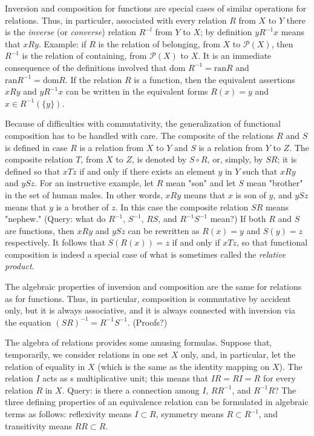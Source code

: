 Inversion and composition for functions are special cases of similar operations for relations. Thus, in particuler, associated with every relation $R$ from $X$ to $Y$ there is the \textit{inverse} (or \textit{converse}) relation $R^{-l}$ from $Y$ to $X$; by definition $y R^{-1} x$ means that $xRy$. Example: if $R$ is the relation of belonging, from $X$ to $\mathcal{P}(X)$, then $R^{-1}$ is the relation of containing, from $\mathcal{P}(X)$ to $X$. It is an immediate consequence of the definitions involved that $\text{dom }R^{-1} = \text{ran} R$ and $\text{ran}R^{-1} = \text{dom} R$. If the relation $R$ is a function, then the equivalent assertions $xRy$ and $yR^{-1}x$ can be written in the equivalent forms $R(x) = y$ and $x \in R^{-1}( \{ y \} )$. 

Because of difficulties with commutativity, the generalization of functional composition has to be handled with care. The composite of the relations $R$ and $S$ is defined in case $R$ is a relation from $X$ to $Y$ and $S$ is a relation from $Y$ to $Z$. The composite relation $T$, from $X$ to $Z$, is denoted by $S \circ R$, or, simply, by $SR$; it is defined so that $xTz$ if and only if there exists an element $y$ in $Y$ such that $xRy$ and $ySz$. For an instructive example, let $R$ mean "son" and let $S$ mean "brother" in the set of human males. In other words, $xRy$ means that $x$ is son of $y$, and $ySz$ means that $y$ is a brother of $z$. In this case the composite relation $SR$ means "nephew." (Query: what do $R^{-1}$, $S^{-1}$, $RS$, and $R^{-1}S^{-1}$ mean?) If both $R$ and $S$ are functions, then $xRy$ and $ySz$ can be rewritten as $R(x) = y$ and $S(y) = z$ respectively. It follows that $S(R(x)) = z$ if and only if $xTz$, so that functional composition is indeed a special case of what is sometimes called the \textit{relative product}.

The algebraic properties of inversion and composition are the same for relations as for functions. Thus, in particular, composition is commutative by accident only, but it is always associative, and it is always connected with inversion via the equation $(SR)^{-1} = R^{-1}S^{-1}$. (Proofs?) 

The algebra of relations provides some amusing formulas.   Suppose that, temporarily, we consider relations in one set $X$ only, and, in particular, let the relation of equality in $X$ (which is the same as the identity mapping on $X$). The relation $I$ acts as s multiplicative unit; this means that $IR = RI = R$ for every relation $R$ in $X$. Query: is there a connection among $I$, $RR^{-1}$, and $R^{-1}R$? The three defining properties of an equivalence relation can be formulated in algebraic terms as follows: reflexivity means $I \subset R$, symmetry means $R \subset R^{-1}$, and transitivity means $RR \subset R$. 

